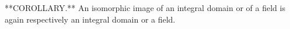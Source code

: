 **COROLLARY.** An isomorphic image of an integral domain or of a field is again respectively an integral domain or a field.

